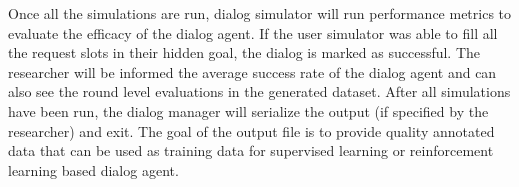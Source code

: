 Once all the simulations are run, dialog simulator will run performance metrics to evaluate the efficacy of the dialog agent. If the user simulator was able to fill all the request slots in their hidden goal, the dialog is marked as successful. The researcher will be informed the average success rate of the dialog agent and can also see the round level evaluations in the generated dataset. After all simulations have been run, the dialog manager will serialize the output (if specified by the researcher) and exit. The goal of the output file is to provide quality annotated data that can be used as training data for supervised learning or reinforcement learning based dialog agent. 



